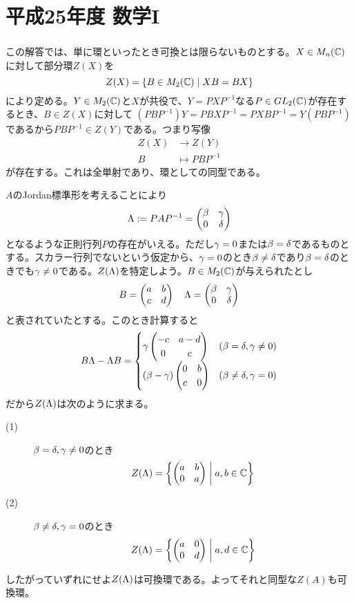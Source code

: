 \section{平成25年度 数学I}

\subsubsection{}%
\begin{sol}
この解答では、単に環といったとき可換とは限らないものとする。$X \in M_n({\mathbb C})$に対して部分環$Z(X)$を
\[
Z(X) = \left\{  B \in M_2({\mathbb C})  \mathrel{} \middle| \mathrel{}  XB = BX  \right\}
\]
により定める。$Y \in M_2({\mathbb C})$と$X$が共役で、$Y = PXP^{-1}$なる$P \in GL_2({\mathbb C})$が存在するとき、$B \in Z(X)$に対して
$  (PBP^{-1}) Y = PBXP^{-1} = PXBP^{-1} = Y (PBP^{-1})$
であるから$PBP^{-1} \in Z(Y)$である。つまり写像
\begin{align*}
  Z(X) &\to Z(Y) \\
  B &\mapsto PBP^{-1}
\end{align*}
が存在する。これは全単射であり、環としての同型である。

  $A$のJordan標準形を考えることにより
  \[
  {\Lambda} := PAP^{-1} = \begin{pmatrix}  \beta & {\gamma} \\ 0 & {\delta} \end{pmatrix}
  \]
  となるような正則行列$P$の存在がいえる。ただし${\gamma}=0$または$\beta = {\delta}$であるものとする。スカラー行列でないという仮定から、${\gamma}=0$のとき$\beta \neq {\delta}$であり$\beta = {\delta}$のときでも${\gamma} \neq 0$である。$Z({\Lambda})$を特定しよう。$B \in M_2({\mathbb C})$が与えられたとし
  \[
  B = \begin{pmatrix} a& b \\ c &d   \end{pmatrix} \quad {\Lambda} = \begin{pmatrix}  \beta & {\gamma} \\ 0 & {\delta} \end{pmatrix}
  \]
  と表されていたとする。このとき計算すると
  \begin{align*}
    B {\Lambda} - {\Lambda} B = \begin{cases}
    {\gamma} \begin{pmatrix} -c & a-d \\ 0 & c \end{pmatrix} &(\beta={\delta}, {\gamma} \neq 0) \\
    (\beta - {\gamma}) \begin{pmatrix} 0 & b \\ c & 0 \end{pmatrix} &(\beta \neq {\delta}, {\gamma} =0)
  \end{cases}
  \end{align*}
  だから$Z({\Lambda})$は次のように求まる。

  \begin{description}
    \item[(1)] $\beta={\delta}, {\gamma} \neq 0$のとき
    \[
    Z({\Lambda}) = \left\{  \begin{pmatrix} a & b \\ 0 & a \end{pmatrix}  \mathrel{} \middle| \mathrel{} a,b \in {\mathbb C}  \right\}
    \]
    \item[(2)] $\beta \neq {\delta}, {\gamma} =0$のとき
    \[
    Z({\Lambda}) = \left\{  \begin{pmatrix} a & 0 \\ 0 & d \end{pmatrix}  \mathrel{} \middle| \mathrel{} a,d \in {\mathbb C} \right\}
    \]
  \end{description}

  したがっていずれにせよ$Z({\Lambda})$は可換環である。よってそれと同型な$Z(A)$も可換環。
\end{sol}

